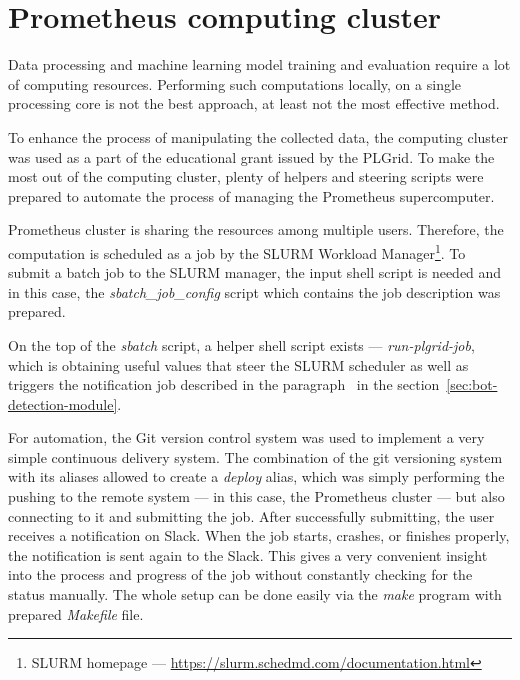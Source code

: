 \section{Prometheus computing cluster}\label{sec:prometheus-computing-cluster}
Data processing and machine learning model training and evaluation require a lot of computing resources.
Performing such computations locally, on a single processing core is not the best approach, at least not the most effective method.

To enhance the process of manipulating the collected data, the computing cluster was used as a part of the educational grant issued by the PLGrid.
To make the most out of the computing cluster, plenty of helpers and steering scripts were prepared to automate the process of managing the Prometheus supercomputer.

Prometheus cluster is sharing the resources among multiple users.
Therefore, the computation is scheduled as a job by the SLURM Workload Manager\footnote{SLURM homepage --- \url{https://slurm.schedmd.com/documentation.html}}.
To submit a batch job to the SLURM manager, the input shell script is needed and in this case, the \textit{sbatch\_job\_config} script which contains the job description was prepared.

On the top of the \textit{sbatch} script, a helper shell script exists --- \textit{run-plgrid-job}, which is obtaining useful values that steer the SLURM scheduler as well as triggers the notification job described in the paragraph~ in the section~\ref{sec:bot-detection-module}.

For automation, the Git version control system was used to implement a very simple continuous delivery system.
The combination of the git versioning system with its aliases allowed to create a \textit{deploy} alias, which was simply performing the pushing to the remote system --- in this case, the Prometheus cluster --- but also connecting to it and submitting the job.
After successfully submitting, the user receives a notification on Slack.
When the job starts, crashes, or finishes properly, the notification is sent again to the Slack.
This gives a very convenient insight into the process and progress of the job without constantly checking for the status manually.
The whole setup can be done easily via the \textit{make} program with prepared \textit{Makefile} file.
